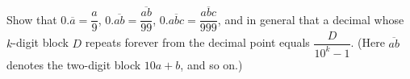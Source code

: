 Show that $0.\overline{a}=\dfrac a9$, $0.\overline{ab}=\dfrac{\overline{ab}}{99}$, $0.\overline{abc}=\dfrac{\overline{abc}}{999}$, and in general that a decimal whose $k$-digit block $D$ repeats forever from the decimal point equals $\dfrac{D}{10^k-1}$. (Here $\overline{ab}$ denotes the two-digit block $10a+b$, and so on.)
